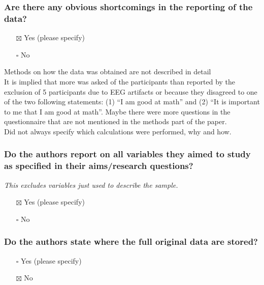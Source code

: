 \documentclass[
  doc, a4paper]{apa7}
\providecommand{\tightlist}{%
  \setlength{\itemsep}{0pt}\setlength{\parskip}{0pt}}
\begin{document}
\subsubsection{Are there any obvious shortcomings in the reporting of the data?}\label{are-there-any-obvious-shortcomings-in-the-reporting-of-the-data}

\begin{itemize}
\tightlist
\item[$\boxtimes$]
  Yes (please specify)
\item[$\square$]
  No
\end{itemize}

Methods on how the data was obtained are not described in detail\\
It is implied that more was asked of the participants than reported by the exclusion of 5 participants due to EEG artifacts or because they disagreed to one of the two following statements: (1) ``I am good at math'' and (2) ``It is important to me that I am good at math''. Maybe there were more questions in the questionnaire that are not mentioned in the methods part of the paper.\\
Did not always specify which calculations were performed, why and how.

\subsubsection{Do the authors report on all variables they aimed to study as specified in their aims/research questions?}\label{do-the-authors-report-on-all-variables-they-aimed-to-study-as-specified-in-their-aimsresearch-questions}

\emph{This excludes variables just used to describe the sample.}

\begin{itemize}
\tightlist
\item[$\boxtimes$]
  Yes (please specify)
\item[$\square$]
  No
\end{itemize}

\subsubsection{Do the authors state where the full original data are stored?}\label{do-the-authors-state-where-the-full-original-data-are-stored}

\begin{itemize}
\tightlist
\item[$\square$]
  Yes (please specify)
\item[$\boxtimes$]
  No
\end{itemize}
\end{document}
